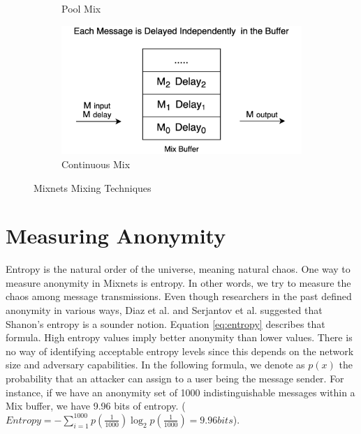 \documentclass[logo,msc,cyber]{infthesis}   %
\begin{document}
\begin{figure}[h!]
\begin{subfigure}[b]{0.45\textwidth}
        \caption{Pool Mix}
        \label{fig:pool-mix}
    \end{subfigure}
    \hfill
    \begin{subfigure}[b]{0.45\textwidth}
        \centering
        \includegraphics[width=\textwidth]{figures/mixing_techniques/continues.png}
        \caption{Continuous Mix}
        \label{fig:continues-mix}
    \end{subfigure}
       \caption{Mixnets Mixing Techniques}
       \label{fig:mixnets-mixing-techniques}
 \end{figure}

\section{Measuring Anonymity}

Entropy is the natural order of the universe, meaning natural chaos. One way to
measure anonymity in Mixnets is entropy. In other words, we try to measure the
chaos among message transmissions. Even though researchers in the past defined
anonymity in various ways\cite{pfitzmann2001anonymity,
reiter1998crowds,diaz2006anonymity}, Diaz et al.\cite{diaz2002towards} and
Serjantov et al.\cite{serjantov2002towards} suggested that Shanon's
entropy\cite{entropy} is a sounder notion. Equation \ref{eq:entropy} describes
that formula. High entropy values imply better anonymity than lower values.
There is no way of identifying acceptable entropy levels since this depends on
the network size and adversary capabilities. In the following formula, we denote
as $p(x)$ the probability that an attacker can assign to a user being the
message sender. For instance, if we have an anonymity set of 1000
indistinguishable messages within a Mix buffer, we have 9.96 bits of entropy.
($Entropy = -\sum_{i = 1}^{1000}p(\frac{1}{1000}) \log_2p(\frac{1}{1000}) = 9.96
bits$). 
\end{document}
